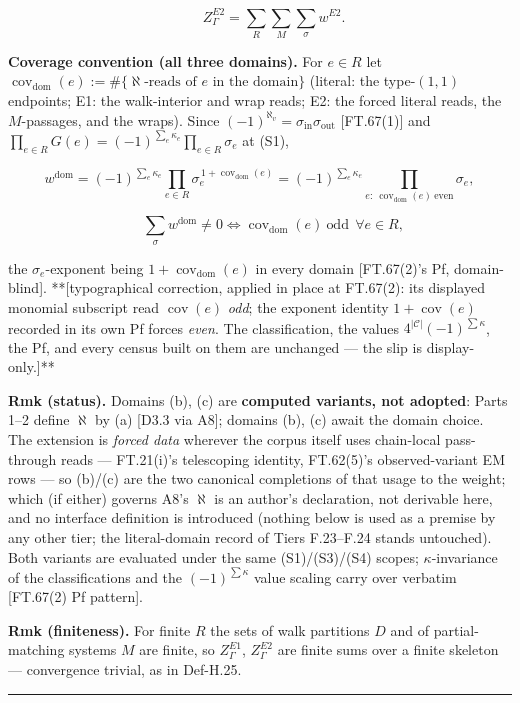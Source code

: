 \begin{definition}
\[
\qquad Z^{E2}_\Gamma=\sum_R\sum_M\sum_\sigma w^{E2}.
\]

\textbf{Coverage convention (all three domains).} For $e\in R$ let $\operatorname{cov}_{\mathrm{dom}}(e):=\#\{\aleph\text{-reads of }e\text{ in the domain}\}$ (literal: the type-$(1,1)$ endpoints; E1: the walk-interior and wrap reads; E2: the forced literal reads, the $M$-passages, and the wraps). Since $(-1)^{\aleph_v}=\sigma_{\mathrm{in}}\sigma_{\mathrm{out}}$ [FT.67(1)] and $\prod_{e\in R}G(e)=(-1)^{\sum_e\kappa_e}\prod_{e\in R}\sigma_e$ at (S1),

\[
w^{\mathrm{dom}}=(-1)^{\sum_e\kappa_e}\prod_{e\in R}\sigma_e^{\,1+\operatorname{cov}_{\mathrm{dom}}(e)}
=(-1)^{\sum_e\kappa_e}\!\!\prod_{e:\ \operatorname{cov}_{\mathrm{dom}}(e)\ \mathrm{even}}\!\!\sigma_e,
\]

\[
\qquad \sum_\sigma w^{\mathrm{dom}}\ne0\iff\operatorname{cov}_{\mathrm{dom}}(e)\ \text{odd}\ \ \forall e\in R,
\]

the $\sigma_e$-exponent being $1+\operatorname{cov}_{\mathrm{dom}}(e)$ in every domain [FT.67(2)'s Pf, domain-blind]. **[typographical correction, applied in place at FT.67(2): its displayed monomial subscript read $\operatorname{cov}(e)$ \textit{odd}; the exponent identity $1+\operatorname{cov}(e)$ recorded in its own Pf forces \textit{even}. The classification, the values $4^{|\mathcal C|}(-1)^{\sum\kappa}$, the Pf, and every census built on them are unchanged — the slip is display-only.]**

\textbf{Rmk (status).} Domains (b), (c) are \textbf{computed variants, not adopted}: Parts 1–2 define $\aleph$ by (a) [D3.3 via A8]; domains (b), (c) await the domain choice. The extension is \textit{forced data} wherever the corpus itself uses chain-local pass-through reads — FT.21(i)'s telescoping identity, FT.62(5)'s observed-variant EM rows — so (b)/(c) are the two canonical completions of that usage to the weight; which (if either) governs A8's $\aleph$ is an author's declaration, not derivable here, and no interface definition is introduced (nothing below is used as a premise by any other tier; the literal-domain record of Tiers F.23–F.24 stands untouched). Both variants are evaluated under the same (S1)/(S3)/(S4) scopes; $\kappa$-invariance of the classifications and the $(-1)^{\sum\kappa}$ value scaling carry over verbatim [FT.67(2) Pf pattern].

\textbf{Rmk (finiteness).} For finite $R$ the sets of walk partitions $D$ and of partial-matching systems $M$ are finite, so $Z^{E1}_\Gamma$, $Z^{E2}_\Gamma$ are finite sums over a finite skeleton — convergence trivial, as in Def-H.25.

\vspace{2pt}\noindent\rule{\textwidth}{0.4pt}\vspace{2pt}

\end{definition}

